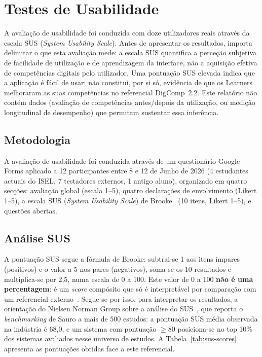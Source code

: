 \section{Testes de Usabilidade} \label{cap:usabilidade}

A avaliação de usabilidade foi conduzida com doze utilizadores reais através da escala SUS (\textit{System Usability Scale}). Antes de apresentar os resultados, importa delimitar o que esta avaliação mede: a escala SUS quantifica a perceção subjetiva de facilidade de utilização e de aprendizagem da interface, não a aquisição efetiva de competências digitais pelo utilizador. Uma pontuação SUS elevada indica que a aplicação é fácil de usar; não constitui, por si só, evidência de que os Learners melhoraram as suas competências no referencial DigComp~2.2. Este relatório não contém dados (avaliação de competências antes/depois da utilização, ou medição longitudinal de desempenho) que permitam sustentar essa inferência.

\subsection{Metodologia} \label{sec:usab-metodologia}

A avaliação de usabilidade foi conduzida através de um questionário Google Forms aplicado a 12 participantes entre 8 e 12 de Junho de 2026 (4 estudantes actuais do ISEL, 7 testadores externos, 1 antigo aluno), organizado em quatro secções: avaliação global (escala 1–5), quatro declarações de envolvimento (Likert 1–5), a escala SUS (\textit{System Usability Scale}) de Brooke~\cite{brooke1996sus} (10 itens, Likert 1–5), e questões abertas.

\subsection{Análise SUS} \label{sec:usab-sus}

A pontuação SUS segue a fórmula de Brooke: subtrai-se 1 aos itens ímpares (positivos) e o valor a 5 nos pares (negativos), soma-se os 10 resultados e multiplica-se por 2,5, numa escala de 0 a 100. Este valor de 0 a 100 \textbf{não é uma percentagem}: é um \textit{score} compósito que só é interpretável por comparação com um referencial externo~\cite{nngroup2018}. Segue-se por isso, para interpretar os resultados, a orientação do Nielsen Norman Group sobre a análise do SUS~\cite{nngroup2018}, que reporta o \textit{benchmarking} de Sauro a mais de 500 estudos: a pontuação SUS média observada na indústria é 68,0, e um sistema com pontuação $\geq$80 posiciona-se no top 10\% dos sistemas avaliados nesse universo de estudos. A Tabela~\ref{tab:sus-scores} apresenta as pontuações obtidas face a este referencial.

